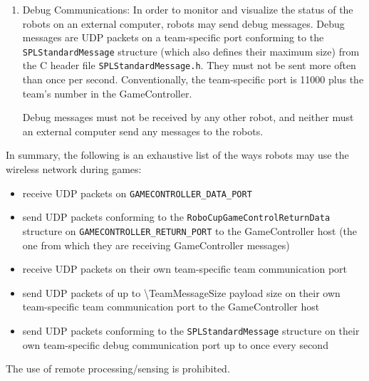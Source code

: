 \begin{enumerate}
\item Debug Communications:
  In order to monitor and visualize the status of the robots on an external computer, robots may send debug messages. Debug messages are UDP packets on a team-specific port conforming to the \texttt{SPLStandardMessage} structure (which also defines their maximum size) from the C header file \texttt{SPLStandardMessage.h}. They must not be sent more often than once per second. Conventionally, the team-specific port is 11000 plus the team's number in the GameController.

  Debug messages must not be received by any other robot, and neither must an external computer send any messages to the robots.
\end{enumerate}

In summary, the following is an exhaustive list of the ways robots may use the wireless network during games:
\begin{itemize}
  \item receive UDP packets on \texttt{GAMECONTROLLER\_DATA\_PORT}
  \item send UDP packets conforming to the \texttt{RoboCupGameControlReturnData} structure on \texttt{GAMECONTROLLER\_RETURN\_PORT} to the GameController host (\ie the one from which they are receiving GameController messages)
  \item receive UDP packets on their own team-specific team communication port
  \item send UDP packets of up to \qty{\TeamMessageSize}{\byte} payload size on their own team-specific team communication port to the GameController host
  \item send UDP packets conforming to the \texttt{SPLStandardMessage} structure on their own team-specific debug communication port up to once every second
\end{itemize}

The use of remote processing/sensing is prohibited.
